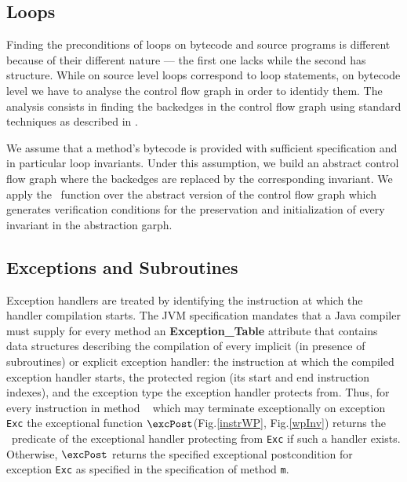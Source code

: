 \subsection{Loops}
Finding the preconditions of loops on bytecode and source programs is different because of their different nature --- 
the first one lacks while the second has structure. While on source level loops correspond to loop statements,  
on bytecode level we have to analyse the control flow graph in order to identidy them.
 The analysis consists in finding the backedges in the control flow graph using standard techniques as described in \cite{ARUCom1986}. 
  
 We assume that a method's bytecode is provided with sufficient specification and in particular loop invariants.
 Under this assumption, we build an abstract control flow graph where the backedges are replaced by
 the corresponding invariant. We apply the \wpi \ function over the abstract version of the control flow graph which generates verification conditions for the 
preservation and initialization of every invariant in the abstraction garph. 


     
\subsection{Exceptions and Subroutines}

Exception handlers are treated by identifying the instruction at which the handler compilation starts. The JVM specification mandates 
that a Java compiler must supply for every method an \textbf{Exception\_Table} attribute that contains data structures describing the compilation of
 every implicit (in presence of subroutines) or explicit exception handler: the instruction at which the compiled exception handler starts,
 the protected region (its start and end instruction indexes), and the exception type the exception handler protects from. Thus, 
for every instruction  in method \method~ which may terminate exceptionally on exception \texttt{Exc} the exceptional function
 $\excPost$(Fig.\ref{instrWP}, Fig.\ref{wpInv}) returns the \wpi \ predicate of the exceptional handler protecting  from \texttt{Exc} if such a handler exists.
Otherwise, $\excPost$ returns the specified exceptional postcondition for exception \texttt{Exc} as specified in the specification of
method \texttt{m}.


